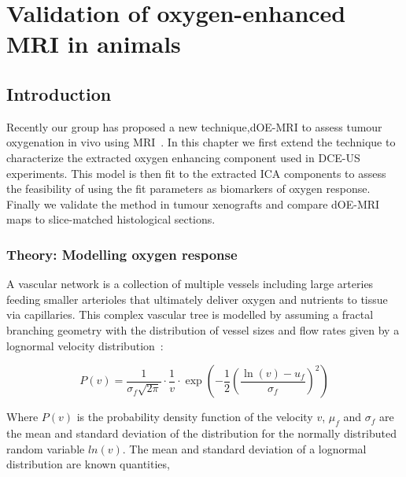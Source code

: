 
\chapter{Validation of oxygen-enhanced MRI in animals}
\label{ch:oemri2}

\section{Introduction}

Recently our group has proposed a new technique,\acs{dOE-MRI} to assess tumour oxygenation in vivo using MRI~\cite{Moosvi:2018ca}.
In this chapter we first extend the technique to characterize the extracted oxygen enhancing component used in \acs{DCE-US} experiments.
This model is then fit to the extracted \acs{ICA} components to assess the feasibility of using the fit parameters as biomarkers of oxygen response.
Finally we validate the method in tumour xenografts and compare \acs{dOE-MRI} maps to slice-matched histological sections.

\subsection{Theory: Modelling oxygen response}
\label{sec:lognormalfitting_theory}
A vascular network is a collection of multiple vessels including large arteries feeding smaller arterioles that ultimately deliver oxygen and nutrients to tissue via capillaries.
This complex vascular tree is modelled by assuming a fractal branching geometry with the distribution of vessel sizes and flow rates given by a lognormal velocity distribution~\cite{Qian:2000ca}:

\begin{equation}
P(v)=\frac{1}{\sigma_{f} \sqrt{2 \pi}} \cdot \frac{1}{v} \cdot \exp \left(-\frac{1}{2}\left(\frac{\ln (v)-u_{f}}{\sigma_{f}}\right)^{2}\right)
\end{equation}

Where $P(v)$ is the probability density function of the velocity $v$, $\mu_f$ and $\sigma_f$ are the mean and standard deviation of the distribution for the normally distributed random variable $ln(v)$.
The mean and standard deviation of a lognormal distribution are known quantities,

